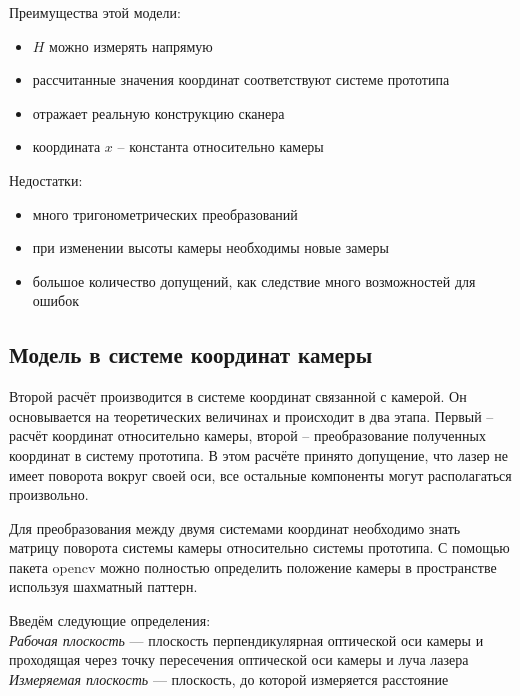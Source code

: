             Преимущества этой модели:
            \begin{itemize}
                \item $ H $ можно измерять напрямую
                \item рассчитанные значения координат соответствуют системе прототипа
                \item отражает реальную конструкцию сканера
                \item координата $ x $ -- константа относительно камеры
            \end{itemize}
            
            Недостатки:
            \begin{itemize}
                \item много тригонометрических преобразований
                \item при изменении высоты камеры необходимы новые замеры
                \item большое количество допущений, как следствие много возможностей для ошибок
            \end{itemize}

        \subsection{Модель в системе координат камеры}
            Второй расчёт производится в системе координат связанной с камерой. Он основывается на теоретических величинах и происходит в два этапа. Первый -- расчёт координат относительно камеры, второй -- преобразование полученных координат в систему прототипа. В этом расчёте принято допущение, что лазер не имеет поворота вокруг своей оси, все остальные компоненты могут располагаться произвольно.
            
            Для преобразования между двумя системами координат необходимо знать матрицу поворота системы камеры относительно системы прототипа. С помощью пакета opencv можно полностью определить положение камеры в пространстве используя шахматный паттерн\cite{opencvCALIBRATION}.

            Введём следующие определения:\\
            \textit{Рабочая плоскость} --- плоскость перпендикулярная оптической оси камеры и проходящая через точку пересечения оптической оси камеры и луча лазера\\
            \textit{Измеряемая плоскость} --- плоскость, до которой измеряется расстояние 

